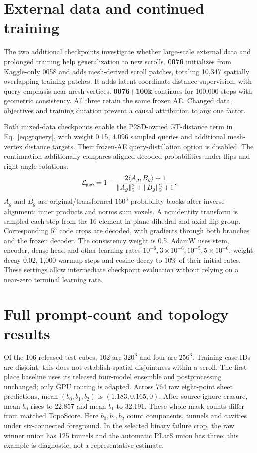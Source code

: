 


\section{External data and continued training}
\label{supp:checkpoints}
The two additional checkpoints investigate whether large-scale external data
and prolonged training help generalization to new scrolls.
\textbf{0076} initializes from Kaggle-only 0058 and adds mesh-derived
scroll patches, totaling 10,347 spatially overlapping training patches.
It adds latent coordinate-distance supervision, with query emphasis near mesh
vertices. \textbf{0076+100k} continues for 100,000 steps with geometric
consistency. All three retain the same frozen AE. Changed data, objectives and
training duration prevent a causal attribution to any one factor.

Both mixed-data checkpoints enable the P2SD-owned GT-distance term in
Eq.~\ref{eq:gtquery}, with weight 0.15, 4,096 sampled queries and additional
mesh-vertex distance targets. Their frozen-AE query-distillation option is
disabled. The continuation additionally compares aligned decoded probabilities
under flips and right-angle rotations:
\begin{equation}
 \mathcal L_{\rm geo}=1-
 \frac{2\langle A_g,B_g\rangle+1}{\|A_g\|_2^2+\|B_g\|_2^2+1}.
\end{equation}
$A_g$ and $B_g$ are original/transformed $160^3$ probability blocks after inverse
alignment; inner products and norms sum voxels. A nonidentity transform is
sampled each step from the 16-element in-plane dihedral and axial-flip group.
Corresponding $5^3$ code crops are decoded, with gradients through both branches
and the frozen decoder. The consistency weight is 0.5.
AdamW uses stem, encoder, dense-head and other learning rates
$10^{-6},3\times10^{-6},10^{-5},5\times10^{-6}$, weight decay 0.02,
1,000 warmup steps and cosine decay to 10\% of their initial rates.
These settings allow intermediate checkpoint evaluation without relying on a
near-zero terminal learning rate.

\section{Full prompt-count and topology results}
Of the 106 released test cubes, 102 are $320^3$ and four are $256^3$.
Training-case IDs are disjoint; this does not establish spatial disjointness
within a scroll. The first-place baseline uses its released four-model
ensemble and postprocessing unchanged; only GPU routing is adapted.
Across 764 raw eight-point sheet predictions, mean $(b_0,b_1,b_2)$ is
$(1.183,0.165,0)$. After source-ignore erasure, mean $b_0$ rises to 22.857
and mean $b_1$ to 32.191. These whole-mask counts differ from matched TopoScore.
Here $b_0,b_1,b_2$ count components, tunnels and cavities under six-connected
foreground. In the selected binary failure crop, the raw winner union has
125 tunnels and the automatic PLatS union has three; this example is diagnostic,
not a representative estimate.


